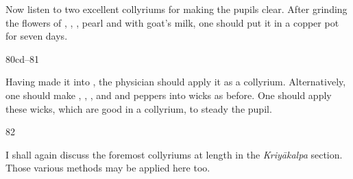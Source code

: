 \begin{translation}
    Now listen to two excellent collyriums for making the pupils clear.  
After grinding the flowers of ,
,  
, pearl and  with goat's milk, 
one should put it in a copper pot for seven days.

\item[80cd--81]

Having made it into , the physician should apply it as a collyrium.  
Alternatively, one should make 
, 
,
, and 
and peppers into wicks as before.  One should apply these wicks, which are good in a 
collyrium, to steady the pupil. 

\item[82]

I shall again discuss the foremost collyriums at length in the \emph{Kriyākalpa} section. 
Those various methods may be applied here too. 
    
    
    \end{translation}
    
    
    
    
